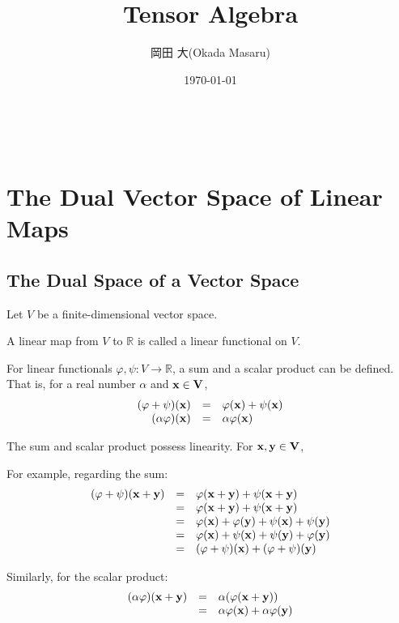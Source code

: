 \documentclass[uplatex,a4j,12pt,dvipdfmx]{jsarticle}
\title{
Tensor Algebra
}
\author{岡田 大(Okada Masaru)}
\date{\today}
\begin{document}
\maketitle

\tableofcontents

\ \\

\section{The Dual Vector Space of Linear Maps}

\subsection{The Dual Space of a Vector Space}

Let $V$ be a finite-dimensional vector space.

A linear map from $V$ to $\mathbb{R}$ is called a linear functional on $V$.

For linear functionals $\varphi, \psi : V \to \mathbb{R}$,
a sum and a scalar product can be defined.
That is, for a real number $\alpha$ and
$\bf{x} \in V$,
\[
	\begin{array}{rcl}
		(\varphi + \psi) (\bf{x}) & = & \varphi (\bf{x}) + \psi (\bf{x})
		\\
		(\alpha \varphi) (\bf{x}) & = & \alpha \varphi (\bf{x})
	\end{array}
\]

The sum and scalar product possess linearity.
For $\bf{x}, \bf{y} \in V$,

For example, regarding the sum:
\[
	\begin{array}{rcl}
		(\varphi + \psi) (\bf{x} + \bf{y}) & = & \varphi (\bf{x} + \bf{y}) + \psi (\bf{x} + \bf{y})
		\\
		                                   & = &
		\varphi (\bf{x} + \bf{y}) + \psi (\bf{x} + \bf{y})
		\\
		                                   & = &
		\varphi (\bf{x}) + \varphi (\bf{y})
		+
		\psi (\bf{x}) + \psi (\bf{y})
		\\
		                                   & = &
		\varphi (\bf{x}) + \psi (\bf{x})
		+ \psi (\bf{y}) + \varphi (\bf{y})
		\\
		                                   & = &
		(\varphi + \psi) (\bf{x}) + (\varphi + \psi) (\bf{y})
	\end{array}
\]

Similarly, for the scalar product:
\[
	\begin{array}{rcl}
		(\alpha \varphi) (\bf{x} + \bf{y}) & = & \alpha ( \varphi (\bf{x} + \bf{y}) )
		\\
		                                   & = &
		\alpha \varphi (\bf{x}) + \alpha \varphi (\bf{y})
	\end{array}
\]
\end{document}
